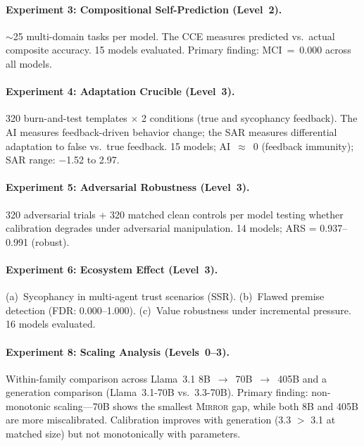 \documentclass[10pt]{article}
\newcommand{\mirror}{\textsc{Mirror}}
\newcommand{\MCI}{MCI}
\newcommand{\CCE}{CCE}
\newcommand{\ARS}{ARS}
\newcommand{\SSR}{SSR}
\newcommand{\FDR}{FDR}
\newcommand{\SAR}{SAR}
\newcommand{\AI}{AI}
\begin{document}
\paragraph{Experiment 3: Compositional Self-Prediction (Level~2).}
${\sim}$25 multi-domain tasks per model. The \CCE{} measures predicted vs.\ actual
composite accuracy. 15 models evaluated. Primary finding: \MCI{}~=~0.000 across
all models.

\paragraph{Experiment 4: Adaptation Crucible (Level~3).}
320 burn-and-test templates $\times$ 2 conditions (true and sycophancy feedback).
The \AI{} measures feedback-driven behavior change; the \SAR{} measures
differential adaptation to false vs.\ true feedback. 15 models; \AI{}~$\approx$~0
(feedback immunity); \SAR{} range: $-$1.52 to 2.97.

\paragraph{Experiment 5: Adversarial Robustness (Level~3).}
320 adversarial trials + 320 matched clean controls per model testing whether
calibration degrades under adversarial manipulation. 14 models; \ARS{} =
0.937--0.991 (robust).

\paragraph{Experiment 6: Ecosystem Effect (Level~3).}
(a)~Sycophancy in multi-agent trust scenarios (\SSR{}). (b)~Flawed premise
detection (\FDR{}: 0.000--1.000). (c)~Value robustness under incremental pressure.
16 models evaluated.

\paragraph{Experiment 8: Scaling Analysis (Levels~0--3).}
Within-family comparison across Llama~3.1 8B~$\to$~70B~$\to$~405B and a generation
comparison (Llama~3.1-70B vs.\ 3.3-70B). Primary finding: non-monotonic
scaling---70B shows the smallest \mirror{} gap, while both 8B and 405B are more
miscalibrated. Calibration improves with generation (3.3 $>$ 3.1 at matched size)
but not monotonically with parameters.
\end{document}
